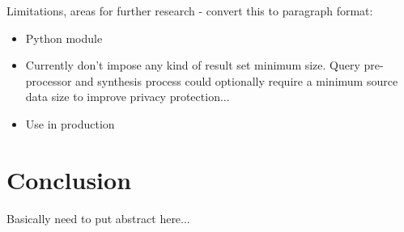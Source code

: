 \documentclass{article}
\begin{document}
Limitations, areas for further research - convert this to paragraph format:

\begin{itemize}
    \item Python module
    \item Currently don't impose any kind of result set minimum size. Query pre-processor and synthesis process could optionally require a minimum source data size to improve privacy protection...
    \item Use in production
\end{itemize}


\section{Conclusion}

Basically need to put abstract here...





\end{document}
